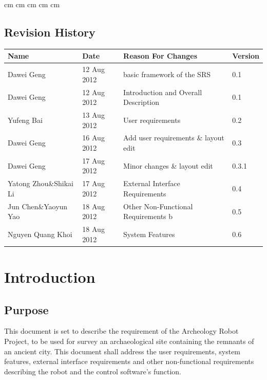 \documentclass[11pt, a4paper]{report}
\begin{document}
 cm
 cm
 cm
 cm
 cm

\tableofcontents






\clearpage
\section*{Revision History}
\begin{tabular}{| l | l | l | l | }
\hline
Name      		&	Date        	&	Reason For Changes                  	&	Version     	\\ \hline
Dawei Geng      & 	12 Aug 2012    	& 	basic framework of the SRS     			&	0.1             \\ \hline
Dawei Geng      &	12 Aug 2012    	& 	Introduction and Overall Description    &	0.1             \\ \hline
Yufeng Bai  	&	13 Aug 2012 	&	User requirements 						&	0.2  			\\ \hline
Dawei Geng		&	16 Aug 2012		&	Add user requirements \& layout edit	&	0.3 			\\ \hline
Dawei Geng		&	17 Aug 2012		&	Minor changes \& layout edit			&	0.3.1 			\\ \hline
Yatong Zhou\&Shikai Li		&	17 Aug 2012		&		External Interface Requirements		&	0.4			\\ \hline
Jun Chen\&Yaoyun Yao		&	18 Aug 2012		&		Other Non-Functional Requirements	b&	0.5			\\ \hline
Nguyen Quang Khoi			&	18 Aug 2012		&		System Features			&	0.6				\\ \hline






\end{tabular}
\clearpage


\chapter{Introduction}

\section{Purpose}
This document is set to describe the requirement of the Archeology Robot Project, to be used for survey an archaeological site containing the remnants of an ancient city. This document shall address the user requirements, system features, external interface requirements and other non-functional requirements describing the robot and the control software's function. 
\end{document}
